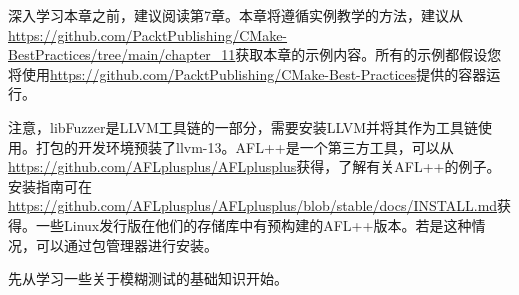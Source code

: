 深入学习本章之前，建议阅读第7章。本章将遵循实例教学的方法，建议从\url{https://github.com/PacktPublishing/CMake-BestPractices/tree/main/chapter\_11}获取本章的示例内容。所有的示例都假设您将使用\url{https://github.com/PacktPublishing/CMake-Best-Practices}提供的容器运行。

注意，libFuzzer是LLVM工具链的一部分，需要安装LLVM并将其作为工具链使用。打包的开发环境预装了llvm-13。AFL++是一个第三方工具，可以从\url{https://github.com/AFLplusplus/AFLplusplus}获得，了解有关AFL++的例子。安装指南可在\url{https://github.com/AFLplusplus/AFLplusplus/blob/stable/docs/INSTALL.md}获得。一些Linux发行版在他们的存储库中有预构建的AFL++版本。若是这种情况，可以通过包管理器进行安装。

先从学习一些关于模糊测试的基础知识开始。